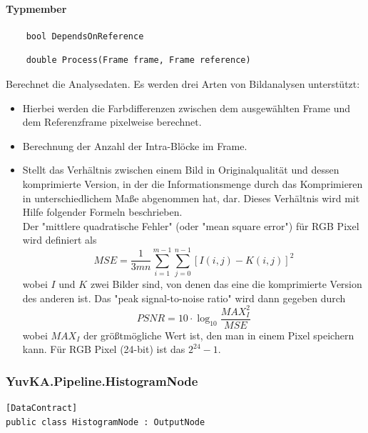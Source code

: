 \paragraph{Typmember}
\begin{itemize}

	\begin{verbatim}
	bool DependsOnReference
	\end{verbatim}
	
	\begin{verbatim}
	double Process(Frame frame, Frame reference)
	\end{verbatim}
	Berechnet die Analysedaten. Es werden drei Arten von Bildanalysen unterstützt: 
		\begin{itemize}
			\item {} Hierbei werden die Farbdifferenzen zwischen dem ausgewählten Frame und dem Referenzframe pixelweise berechnet.
			\item {} Berechnung der Anzahl der Intra-Blöcke im Frame.
			\item {} Stellt das Verhältnis zwischen einem Bild in Originalqualität und dessen komprimierte Version, in der die Informationsmenge durch das Komprimieren in unterschiedlichem Maße abgenommen hat, dar. Dieses Verhältnis wird mit Hilfe folgender Formeln beschrieben. \\
			Der "mittlere quadratische Fehler" (oder "mean square error") für RGB Pixel wird definiert als 
			\[ MSE = \frac{1}{3mn} \sum_{i = 1}^{m - 1}{ \sum_{j = 0}^{n - 1}{[I(i, j) - K(i, j)]^2} } \]
			wobei $ I $ und $ K $ zwei Bilder sind, von denen das eine die komprimierte Version des anderen ist. Das "peak signal-to-noise ratio" wird dann gegeben durch
			\[ PSNR = 10 \cdot \log_{10}{\frac{MAX_I^2}{MSE}} \]
			wobei $ MAX_I $ der größtmögliche Wert ist, den man in einem Pixel speichern kann. Für RGB Pixel (24-bit) ist das $ 2^{24} - 1 $.
		\end{itemize}
		
\end{itemize}

\subsubsection{YuvKA.Pipeline.HistogramNode}

\begin{verbatim}
[DataContract]
public class HistogramNode : OutputNode
\end{verbatim}

